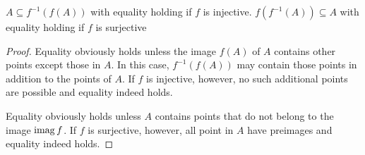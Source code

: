 \begin{proposition}\label{thm:function_image_preimage_composition}\mbox{}
  \begin{PropEnum}
     \( A \subseteq f^{-1}(f(A)) \) with equality holding if \( f \) is injective.
     \( f(f^{-1}(A)) \subseteq A \) with equality holding if \( f \) is surjective
  \end{PropEnum}
\end{proposition}
\begin{proof}
   Equality obviously holds unless the image \( f(A) \) of \( A \) contains other points except those in \( A \). In this case, \( f^{-1}(f(A)) \) may contain those points in addition to the points of \( A \). If \( f \) is injective, however, no such additional points are possible and equality indeed holds.

   Equality obviously holds unless \( A \) contains points that do not belong to the image \( \operatorname{imag} f \). If \( f \) is surjective, however, all point in \( A \) have preimages and equality indeed holds.
\end{proof}

